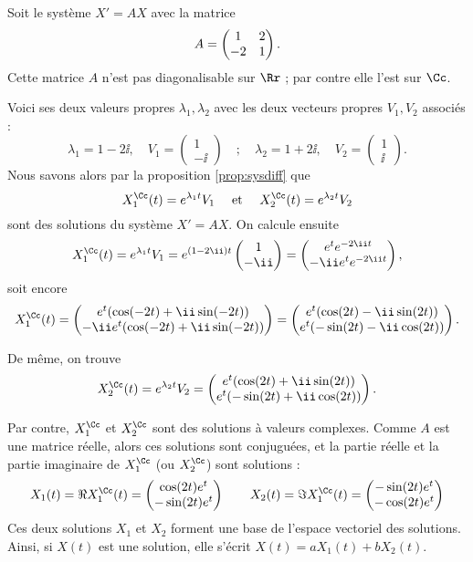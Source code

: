 \documentclass[12pt, class=report,crop=false]{standalone}
\begin{document}
\begin{exemple}
Soit le système $X'=AX$ avec la matrice
$$A = \begin{pmatrix}1&2\cr -2&1\end{pmatrix}.$$
Cette matrice $A$ n'est pas diagonalisable sur $\Rr$ ; par contre elle l'est sur $\Cc$.

Voici ses deux valeurs propres $\lambda_1,\lambda_2$ avec les deux vecteurs propres $V_1,V_2$ associés :
$$\lambda_1 = 1 - 2\ii, \quad V_1 = \begin{pmatrix} 1\\-\ii\end{pmatrix}
\quad;\quad
\lambda_2 = 1 + 2\ii, \quad V_2 = \begin{pmatrix} 1\\\ii\end{pmatrix}.$$
Nous savons alors par la proposition \ref{prop:sysdiff} que 
$$X_{1}^{\Cc}(t) = e^{\lambda_1 t} V_1 \quad \text{ et } \quad
X_{2}^{\Cc}(t) = e^{\lambda_2 t} V_2 $$
sont des solutions du système $X'=AX$.
On calcule ensuite
$$X_{1}^{\Cc}(t) 
= e^{\lambda_1 t} V_1
= e^{(1-2\ii)t} \begin{pmatrix} 1\\ -\ii\end{pmatrix}
= \begin{pmatrix} e^t e^{-2\ii t} \\ -\ii e^t e^{-2\ii t} \end{pmatrix},$$
soit encore
$$X_{1}^{\Cc}(t)
= \begin{pmatrix} e^t ( \cos(-2t)+ \ii \sin(-2t) ) \\ -\ii e^t( \cos(-2t)+ \ii \sin(-2t) )   \end{pmatrix}
= \begin{pmatrix} e^t ( \cos(2t) - \ii \sin(2t) ) \\  e^t( -\sin(2t)- \ii \cos(2t) )   \end{pmatrix}.$$

De même, on trouve 
$$X_{2}^{\Cc}(t) 
= e^{\lambda_2 t} V_2
= \begin{pmatrix} e^t ( \cos(2t) + \ii \sin(2t) ) \\  e^t( -\sin(2t) + \ii \cos(2t) ) \end{pmatrix}.$$


Par contre, $X_1^{\Cc}$ et $X_2^{\Cc}$ sont des solutions à valeurs complexes.
Comme $A$ est une matrice réelle, alors ces solutions sont conjuguées, et la partie réelle et la partie imaginaire de $X_1^{\Cc}$ (ou $X_2^{\Cc}$) sont solutions :
$$X_1(t) = \Re X_1^{\Cc}(t) =
 \begin{pmatrix}  \cos(2t)e^t \\  -\sin(2t)e^t  \end{pmatrix}
 \qquad 
 X_2(t) = \Im X_1^{\Cc}(t) =
 \begin{pmatrix}  -\sin(2t)e^t \\ -\cos(2t)e^t \end{pmatrix}$$
Ces deux solutions $X_1$ et $X_2$ forment une base de l'espace vectoriel des solutions. Ainsi, si $X(t)$ est une solution, elle s'écrit
$X(t) = a X_1(t) + b X_2(t)$.


\end{exemple}
\end{document}
